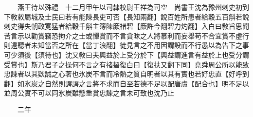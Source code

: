 　　燕王待以殊禮　十二月甲午以司隸校尉王祥為司空　尚書王沈為豫州刺史初到下敎敕屬城及士民曰若有能陳長吏可否【長知兩翻】說百姓所患者給穀五百斛若說刺史得失朝政寛猛者給穀千斛主簿陳廞禇䂮【廞許今翻䂮力灼翻】入白曰敎旨思聞苦言示以勸賞竊恐拘介之士或憚賞而不言貪昧之人將慕利而妄舉苟不合宜賞不虛行則遠聽者未知當否之所在【當丁浪翻】徒見言之不用因謂設而不行愚以為告下之事可少須後【須待也】沈又敎曰夫興益於上受分於下【興益謂進言有益於上也受分謂受賞也】斯乃君子之操何不言之有禇䂮復白曰【復扶又翻下同】堯舜周公所以能致忠諫者以其欵誠之心著也氷炭不言而冷熱之質自明者以其有實也若好忠直【好呼到翻】如氷炭之自然則諤諤之言將不求而自至若德不足以配唐虞【配合也】明不足以並周公實不可以同氷炭雖懸重賞忠諫之言未可致也沈乃止

　　二年